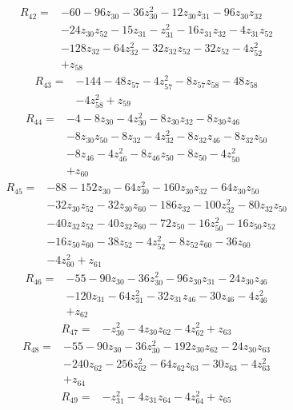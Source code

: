 \begin{align*}
R_{42}={}&-60-96z_{30}-36z_{30}^{2}-12z_{30}z_{31}-96z_{30}z_{32}\\
&-24z_{30}z_{52}-15z_{31}-z_{31}^{2}-16z_{31}z_{32}-4z_{31}z_{52}\\
&-128z_{32}-64z_{32}^{2}-32z_{32}z_{52}-32z_{52}-4z_{52}^{2}\\
&+z_{58}
\end{align*}
\begin{align*}
R_{43}={}&-144-48z_{57}-4z_{57}^{2}-8z_{57}z_{58}-48z_{58}\\
&-4z_{58}^{2}+z_{59}
\end{align*}
\begin{align*}
R_{44}={}&-4-8z_{30}-4z_{30}^{2}-8z_{30}z_{32}-8z_{30}z_{46}\\
&-8z_{30}z_{50}-8z_{32}-4z_{32}^{2}-8z_{32}z_{46}-8z_{32}z_{50}\\
&-8z_{46}-4z_{46}^{2}-8z_{46}z_{50}-8z_{50}-4z_{50}^{2}\\
&+z_{60}
\end{align*}
\begin{align*}
R_{45}={}&-88-152z_{30}-64z_{30}^{2}-160z_{30}z_{32}-64z_{30}z_{50}\\
&-32z_{30}z_{52}-32z_{30}z_{60}-186z_{32}-100z_{32}^{2}-80z_{32}z_{50}\\
&-40z_{32}z_{52}-40z_{32}z_{60}-72z_{50}-16z_{50}^{2}-16z_{50}z_{52}\\
&-16z_{50}z_{60}-38z_{52}-4z_{52}^{2}-8z_{52}z_{60}-36z_{60}\\
&-4z_{60}^{2}+z_{61}
\end{align*}
\begin{align*}
R_{46}={}&-55-90z_{30}-36z_{30}^{2}-96z_{30}z_{31}-24z_{30}z_{46}\\
&-120z_{31}-64z_{31}^{2}-32z_{31}z_{46}-30z_{46}-4z_{46}^{2}\\
&+z_{62}
\end{align*}
\begin{align*}
R_{47}={}&-z_{30}^{2}-4z_{30}z_{62}-4z_{62}^{2}+z_{63}
\end{align*}
\begin{align*}
R_{48}={}&-55-90z_{30}-36z_{30}^{2}-192z_{30}z_{62}-24z_{30}z_{63}\\
&-240z_{62}-256z_{62}^{2}-64z_{62}z_{63}-30z_{63}-4z_{63}^{2}\\
&+z_{64}
\end{align*}
\begin{align*}
R_{49}={}&-z_{31}^{2}-4z_{31}z_{64}-4z_{64}^{2}+z_{65}
\end{align*}
